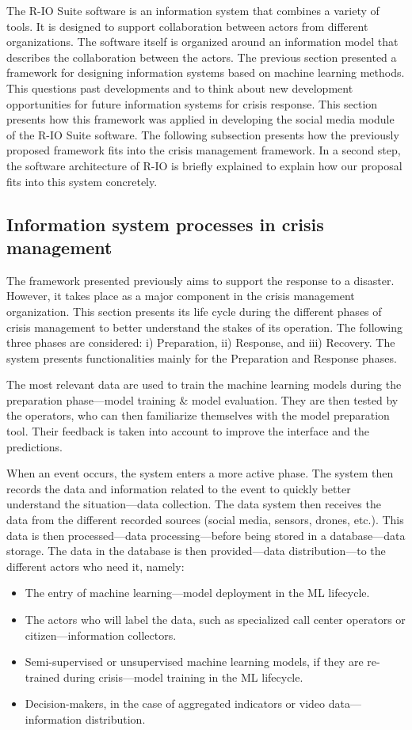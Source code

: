 The R-IO Suite software is an information system that combines a variety of tools.
It is designed to support collaboration between actors from different organizations.
The software itself is organized around an information model that describes the collaboration between the actors.
The previous section presented a framework for designing information systems based on machine learning methods.
This questions past developments and to think about new development opportunities for future information systems for crisis response.
This section presents how this framework was applied in developing the social media module of the R-IO Suite software.
The following subsection presents how the previously proposed framework fits into the crisis management framework.
In a second step, the software architecture of R-IO is briefly explained to explain how our proposal fits into this system concretely.

\subsection{Information system processes in crisis management}
The framework presented previously aims to support the response to a disaster.
However, it takes place as a major component in the crisis management organization.
This section presents its life cycle during the different phases of crisis management to better understand the stakes of its operation.
The following three phases are considered: i) Preparation, ii) Response, and iii) Recovery.
The system presents functionalities mainly for the Preparation and Response phases.

The most relevant data are used to train the machine learning models during the preparation phase—model training \& model evaluation.
They are then tested by the operators, who can then familiarize themselves with the model preparation tool.
Their feedback is taken into account to improve the interface and the predictions.

When an event occurs, the system enters a more active phase.
The system then records the data and information related to the event to quickly better understand the situation—data collection.
The data system then receives the data from the different recorded sources (social media, sensors, drones, etc.).
This data is then processed—data processing—before being stored in a database—data storage.
The data in the database is then provided—data distribution—to the different actors who need it, namely:

\begin{itemize}
    \item The entry of machine learning—model deployment in the ML lifecycle.
    \item The actors who will label the data, such as specialized call center operators or citizen—information collectors.
    \item Semi-supervised or unsupervised machine learning models, if they are re-trained during crisis—model training in the ML lifecycle.
    \item Decision-makers, in the case of aggregated indicators or video data—information distribution.
\end{itemize}

